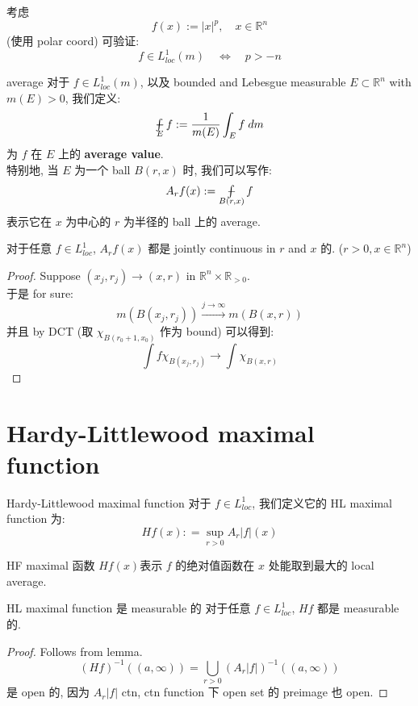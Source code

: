 \documentclass[lang=cn,11pt]{elegantbook}
\newcommand*{\avint}{\mathop{\ooalign{$\int$\cr$-$}}}
\begin{document}
\begin{example}
    考虑 \[
    f(x) := |x|^p, \quad x\in \mathbb{R}^n
    \]
   (使用 polar coord) 可验证: \[
    f\in L^1_{loc}(m) \quad \Longleftrightarrow  \quad p > -n
    \]
\end{example}
 

\begin{definition}{average}
    对于 $f\in L^1_{loc}(m)$, 以及 bounded and Lebesgue measurable $E\subset \mathbb{R}^n$ with $m(E) > 0$, 我们定义: \[
    \avint_E f : = \frac{1}{m(E)}\int_E f\; dm
    \] 为 $f$ 在 $E$ 上的 \textbf{average value}.\\
特别地, 当 $E$ 为一个 ball $B(r,x)$ 时, 我们可以写作: \[
A_r f(x) := \avint_{B(r,x)} f
\]表示它在 $x$ 为中心的 $r$ 为半径的 ball 上的 average.
\end{definition}


\begin{lemma}
对于任意 $f\in L^1_{loc}$, $A_r f(x)$ 都是 jointly continuous in $r$ and $x$ 的. ($r>0, x\in \mathbb{R}^n$)
\end{lemma}
\begin{proof}
    Suppose $(x_j, r_j) \to (x,r)$ in $\mathbb{R}^n \times \mathbb{R}_{>0}$.\\
    于是 for sure: \[
    m(B(x_j, r_j)) \overset{j\to \infty}{\longrightarrow} m(B(x,r))
    \]
并且 by DCT (取 $\chi_{B(r_0+1, x_0)}$ 作为 bound) 可以得到: \[
\int f \chi_{B(x_j,r_j)} \to \int \chi_{B(x,r)}
\]
\end{proof}

\section{Hardy-Littlewood maximal function}
\begin{definition}{Hardy-Littlewood maximal function}
对于 $f \in L^1_{loc}$, 我们定义它的 HL maximal function 为: \[
    Hf(x) : = \sup_{r>0} A_r |f| (x)
    \]
\end{definition}
HF maximal 函数 $Hf(x) $表示 $f$ 的绝对值函数在 $x$ 处能取到最大的 local average.

\begin{theorem}{HL maximal function 是 measurable 的}
    对于任意 $f \in L^1_{loc}$, $Hf$ 都是 measurable 的.
\end{theorem}
\begin{proof}
    Follows from lemma. \[
    (Hf)^{-1} ((a,\infty)) = \bigcup_{r>0} (A_r |f|)^{-1} ((a,\infty))
    \] 是 open 的, 因为 $A_r|f|$ ctn, ctn function 下 open set 的 preimage 也 open.
\end{proof}
\end{document}
